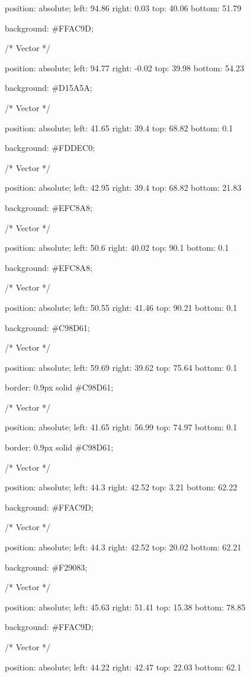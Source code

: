 position: absolute;
left: 94.86%
right: 0.03%
top: 40.06%
bottom: 51.79%

background: #FFAC9D;


/* Vector */

position: absolute;
left: 94.77%
right: -0.02%
top: 39.98%
bottom: 54.23%

background: #D15A5A;


/* Vector */

position: absolute;
left: 41.65%
right: 39.4%
top: 68.82%
bottom: 0.1%

background: #FDDEC0;


/* Vector */

position: absolute;
left: 42.95%
right: 39.4%
top: 68.82%
bottom: 21.83%

background: #EFC8A8;


/* Vector */

position: absolute;
left: 50.6%
right: 40.02%
top: 90.1%
bottom: 0.1%

background: #EFC8A8;


/* Vector */

position: absolute;
left: 50.55%
right: 41.46%
top: 90.21%
bottom: 0.1%

background: #C98D61;


/* Vector */

position: absolute;
left: 59.69%
right: 39.62%
top: 75.64%
bottom: 0.1%

border: 0.9px solid #C98D61;


/* Vector */

position: absolute;
left: 41.65%
right: 56.99%
top: 74.97%
bottom: 0.1%

border: 0.9px solid #C98D61;


/* Vector */

position: absolute;
left: 44.3%
right: 42.52%
top: 3.21%
bottom: 62.22%

background: #FFAC9D;


/* Vector */

position: absolute;
left: 44.3%
right: 42.52%
top: 20.02%
bottom: 62.21%

background: #F29083;


/* Vector */

position: absolute;
left: 45.63%
right: 51.41%
top: 15.38%
bottom: 78.85%

background: #FFAC9D;


/* Vector */

position: absolute;
left: 44.22%
right: 42.47%
top: 22.03%
bottom: 62.1%

